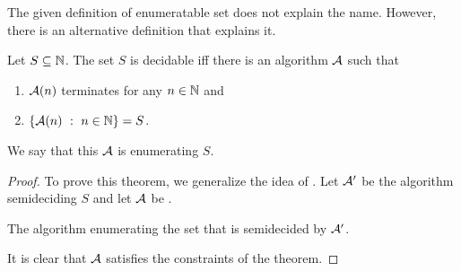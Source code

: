 The given definition of enumeratable set does not explain the name. However,
there is an alternative definition that explains it.
\begin{theorem}
\label{theorem:enumeratable-semidecidable}
  Let $S \subseteq \mathbb{N}$. The set $S$ is decidable iff there is an algorithm
  $\mathcal{A}$ such that
  \begin{enumerate}
    \item $\mathcal{A}(n)$ terminates for any $n \in \mathbb{N}$ and
    \item $\set[n \in  \N]{\Algorithm{A}(n)} = S$.
  \end{enumerate}

  We say that this $\mathcal{A}$ is enumerating $S$.
\end{theorem}
\begin{proof}
  To prove this theorem, we generalize the idea of
  .
  Let $\mathcal{A}'$ be the algorithm semideciding $S$ and
  let $\mathcal{A}$ be .
  \begin{algorithm}
      \begin{algorithmic}[1]
                \Parallel
                \EndParallel
              \EndWhile
          \EndFunction
      \end{algorithmic}
      \caption{The algorithm enumerating the set that is semidecided by
        $\mathcal{A}'$.}
      \label{algorithm:enumerating-from-semideciding}
  \end{algorithm}
  It is clear that $\mathcal{A}$ satisfies the constraints of the theorem.


\end{proof}
